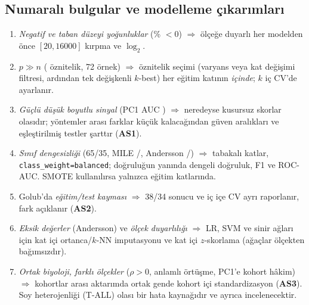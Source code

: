 \documentclass[conference]{IEEEtran}
\newcommand{\AS}[1]{\textbf{AS#1}}
\begin{document}
\subsection{Numaralı bulgular ve modelleme çıkarımları}
\begin{enumerate}
\item \emph{Negatif ve taban düzeyi yoğunluklar} (\%\GolubNegPct{} $<0$) $\Rightarrow$ ölçeğe duyarlı
her modelden önce $[20,16000]$ kırpma ve $\log_2$.
\item \emph{$p\gg n$} (\GolubP{} öznitelik, 72 örnek) $\Rightarrow$ öznitelik seçimi (varyans veya kat
değişimi filtresi, ardından tek değişkenli $k$-best) her eğitim katının \emph{içinde}; $k$ iç CV'de
ayarlanır.
\item \emph{Güçlü düşük boyutlu sinyal} (PC1 AUC \GolubPCOneAUC) $\Rightarrow$ neredeyse kusursuz
skorlar olasıdır; yöntemler arası farklar küçük kalacağından güven aralıkları ve eşleştirilmiş
testler şarttır (\AS{1}).
\item \emph{Sınıf dengesizliği} (65/35, MILE \MileALL/\MileAML, Andersson \AndALL/\AndAML)
$\Rightarrow$ tabakalı katlar, \texttt{class\_weight=balanced}; doğruluğun yanında dengeli doğruluk,
F1 ve ROC-AUC. SMOTE kullanılırsa yalnızca eğitim katlarında.
\item Golub'da \emph{eğitim/test kayması} $\Rightarrow$ 38/34 sonucu ve iç içe CV ayrı raporlanır,
fark açıklanır (\AS{2}).
\item \emph{Eksik değerler} (Andersson) ve \emph{ölçek duyarlılığı} $\Rightarrow$ LR, SVM ve sinir
ağları için kat içi ortanca/$k$-NN imputasyonu ve kat içi $z$-skorlama (ağaçlar ölçekten bağımsızdır).
\item \emph{Ortak biyoloji, farklı ölçekler} ($\rho>0$, anlamlı örtüşme, PC1'e kohort hâkim)
$\Rightarrow$ kohortlar arası aktarımda \CommonAll{} ortak gende kohort içi standardizasyon (\AS{3}).
Soy heterojenliği (T-ALL) olası bir hata kaynağıdır ve ayrıca incelenecektir.
\end{enumerate}

\end{document}
